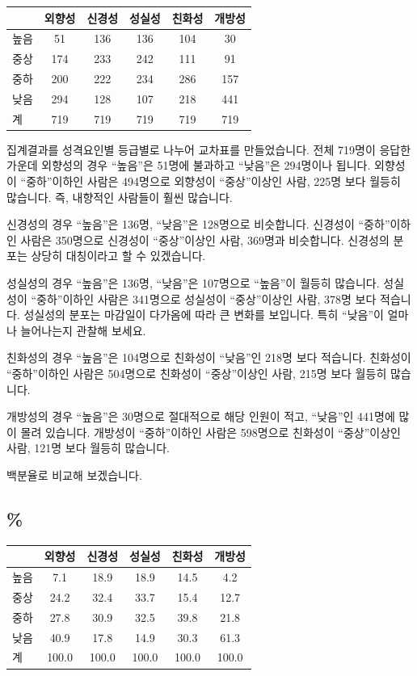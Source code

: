 \documentclass[
]{book}
\begin{document}
\begin{tabular}{l|c|c|c|c|c}
\hline
  & 외향성 & 신경성 & 성실성 & 친화성 & 개방성\\
\hline
높음 & 51 & 136 & 136 & 104 & 30\\
\hline
중상 & 174 & 233 & 242 & 111 & 91\\
\hline
중하 & 200 & 222 & 234 & 286 & 157\\
\hline
낮음 & 294 & 128 & 107 & 218 & 441\\
\hline
계 & 719 & 719 & 719 & 719 & 719\\
\hline
\end{tabular}

집계결과를 성격요인별 등급별로 나누어 교차표를 만들었습니다. 전체 719명이 응답한 가운데 외향성의 경우 ``높음''은 51명에 불과하고 ``낮음''은 294명이나 됩니다. 외향성이 ``중하''이하인 사람은 494명으로 외향성이 ``중상''이상인 사람, 225명 보다 월등히 많습니다. 즉, 내향적인 사람들이 훨씬 많습니다.

신경성의 경우 ``높음''은 136명, ``낮음''은 128명으로 비슷합니다. 신경성이 ``중하''이하인 사람은 350명으로 신경성이 ``중상''이상인 사람, 369명과 비슷합니다. 신경성의 분포는 상당히 대칭이라고 할 수 있겠습니다.

성실성의 경우 ``높음''은 136명, ``낮음''은 107명으로 ``높음''이 월등히 많습니다. 성실성이 ``중하''이하인 사람은 341명으로 성실성이 ``중상''이상인 사람, 378명 보다 적습니다. 성실성의 분포는 마감일이 다가옴에 따라 큰 변화를 보입니다. 특히 ``낮음''이 얼마나 늘어나는지 관찰해 보세요.

친화성의 경우 ``높음''은 104명으로 친화성이 ``낮음''인 218명 보다 적습니다. 친화성이 ``중하''이하인 사람은 504명으로 친화성이 ``중상''이상인 사람, 215명 보다 월등히 많습니다.

개방성의 경우 ``높음''은 30명으로 절대적으로 해당 인원이 적고, ``낮음''인 441명에 많이 몰려 있습니다. 개방성이 ``중하''이하인 사람은 598명으로 친화성이 ``중상''이상인 사람, 121명 보다 월등히 많습니다.

백분율로 비교해 보겠습니다.

\subsection{\%}\label{section-18}

\begin{tabular}{l|c|c|c|c|c}
\hline
  & 외향성 & 신경성 & 성실성 & 친화성 & 개방성\\
\hline
높음 & 7.1 & 18.9 & 18.9 & 14.5 & 4.2\\
\hline
중상 & 24.2 & 32.4 & 33.7 & 15.4 & 12.7\\
\hline
중하 & 27.8 & 30.9 & 32.5 & 39.8 & 21.8\\
\hline
낮음 & 40.9 & 17.8 & 14.9 & 30.3 & 61.3\\
\hline
계 & 100.0 & 100.0 & 100.0 & 100.0 & 100.0\\
\hline
\end{tabular}
\end{document}
